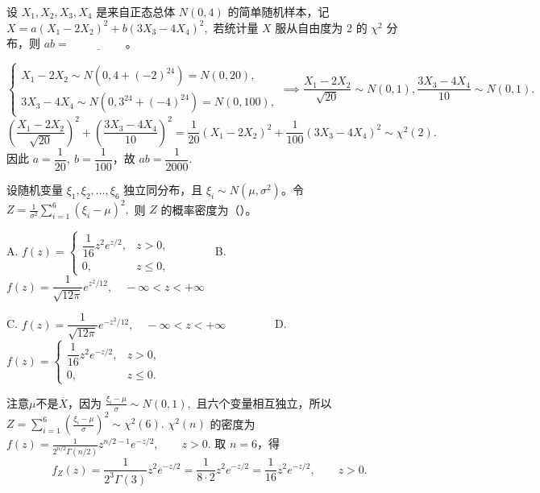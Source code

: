 \documentclass[lang=cn,11pt]{elegantbook}
\begin{document}
\begin{exercise}\label{exer:6-chi2-ab}
设 \(X_1, X_2, X_3, X_4\) 是来自正态总体 \(N(0, 4)\) 的简单随机样本，记
\(
X = a(X_1 - 2X_2)^2 + b(3X_3 - 4X_4)^2,
\)
若统计量 \(X\) 服从自由度为 2 的 \(\chi^2\) 分布，则 \(ab =\,\underline{\hspace{2cm}}\)。
\end{exercise}

\begin{solution}
\[
\begin{cases}
X_1-2X_2\sim N(0,4+(-2)^24)=N(0,20),\\
3X_3-4X_4\sim N(0,3^24+(-4)^24)=N(0,100),
\end{cases}
\implies
\frac{X_1-2X_2}{\sqrt{20}}\sim N(0,1),
\frac{3X_3-4X_4}{10}\sim N(0,1).
\]
\[
\left(\frac{X_1-2X_2}{\sqrt{20}}\right)^2+
\left(\frac{3X_3-4X_4}{10}\right)^2
=\frac{1}{20}(X_1-2X_2)^2+\frac{1}{100}(3X_3-4X_4)^2
\sim \chi^2(2).
\]
因此 \(a=\dfrac1{20},\ b=\dfrac1{100}\)，故
\(
ab=\dfrac1{2000}.
\)
\end{solution}



\begin{exercise}\label{exer:src-2007-a-15}
设随机变量 \(\xi_1,\xi_2,\dots,\xi_6\) 独立同分布，且 \(\xi_i\sim N(\mu,\sigma^2)\)。令
\(
Z=\frac1{\sigma^2}\sum_{i=1}^6(\xi_i-\mu)^2,
\)
则 \(Z\) 的概率密度为（\quad）。\par
A. \(\displaystyle f(z)=
\begin{cases}
\dfrac1{16}z^2e^{z/2}, & z>0,\\
0, & z\le0,
\end{cases}\)~~~~~~~
B. \(\displaystyle f(z)=\dfrac1{\sqrt{12\pi}}e^{z^2/12},\quad -\infty<z<+\infty\)\par
C. \(\displaystyle f(z)=\dfrac1{\sqrt{12\pi}}e^{-z^2/12},\quad -\infty<z<+\infty\)~~~~~~~~
D. \(\displaystyle f(z)=
\begin{cases}
\dfrac1{16}z^2e^{-z/2}, & z>0,\\
0, & z\le0.
\end{cases}\)
\end{exercise}
\begin{solution}
注意$\mu$不是$\overline{X}$，因为
\(
\frac{\xi_i-\mu}{\sigma}\sim N(0,1),
\)
且六个变量相互独立，所以
\(
Z=\sum_{i=1}^6\left(\frac{\xi_i-\mu}{\sigma}\right)^2\sim\chi^2(6).
\)
\(\chi^2(n)\) 的密度为
\(
f(z)=\frac{1}{2^{n/2}\Gamma(n/2)}z^{n/2-1}e^{-z/2},\qquad z>0.
\)
取 \(n=6\)，得
\[
f_Z(z)=\frac{1}{2^3\Gamma(3)}z^2e^{-z/2}
=\frac{1}{8\cdot2}z^2e^{-z/2}
=\frac1{16}z^2e^{-z/2},\qquad z>0.
\]
\end{solution}
\end{document}
